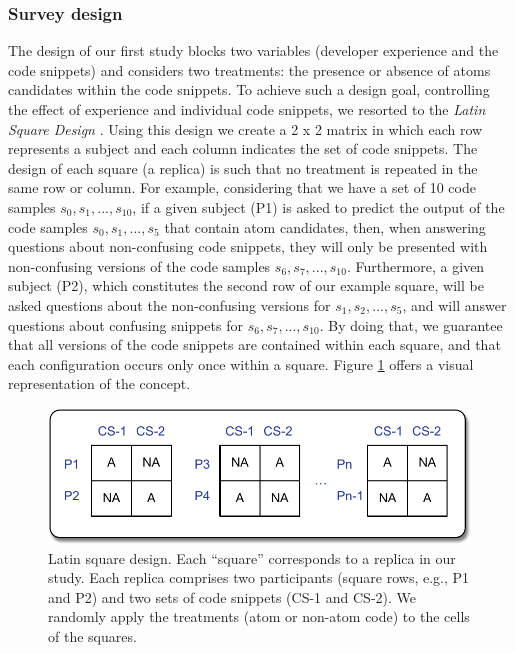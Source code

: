 \subsubsection*{Survey design} 

The design of our first study blocks two variables
(developer experience and the code snippets) and
considers two treatments: the presence or absence of 
atoms candidates within the code snippets. 
To achieve such a design goal, controlling the effect of experience and individual code snippets, we resorted to the \textit{Latin Square Design} \cite{Hunter-Experimenters}. Using this design we create a 2 x 2 matrix in which each row represents a subject and each column indicates the set of code snippets. The design of each square (a replica) is such that no treatment is repeated in the same row or column. For example, considering that we have a set of 10
code samples $s_0, s_1, ..., s_{10}$, if a given subject (P1) is asked to predict the output of the code samples $s_0, s_1, ..., s_5$ that contain atom candidates, then, when answering questions about non-confusing code snippets, they will only be presented with non-confusing versions of the code samples $s_6, s_7,..., s_{10}$. Furthermore, a given subject (P2), which constitutes the second row of our example square, will be asked questions about the non-confusing versions for $s_1, s_2, ..., s_5$, and will answer questions about confusing snippets for $s_6, s_7,..., s_{10}$. By doing that, we guarantee that all versions of the code snippets are contained within each square, and that each configuration occurs only once within a square. Figure \ref{fig:latinsquare} offers a visual representation of the concept.

  \begin{figure}[htb!]
      \noindent
      \centering
      \includegraphics[scale=.50]{images/latin-square.pdf}
      \caption{Latin square design. Each ``square'' corresponds to 
      a replica in our study. Each replica comprises two participants (square rows, e.g., P1 and P2) 
      and two sets of code snippets (CS-1 and CS-2). We randomly apply the 
      treatments (atom or non-atom code) to the cells of the squares.} 
      \label{fig:latinsquare}
  \end{figure}



